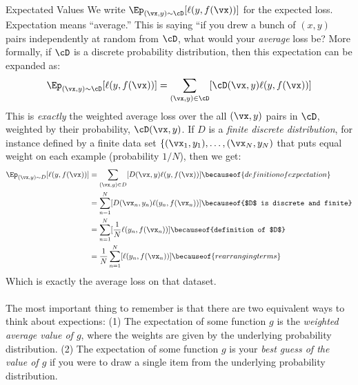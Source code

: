 \begin{mathreview}{Expectated Values}
We write $\Ep_{(\vx,y) \sim \cD} [ \ell(y, f(\vx)) ]$ for the expected loss. Expectation means ``average.'' This is saying ``if you drew a bunch of $(x,y)$ pairs independently at random from $\cD$, what would your \emph{average} loss be?%
More formally, if $\cD$ is a discrete probability distribution, then this expectation can be expanded as:
%
\begin{equation}
  \Ep_{(\vx,y) \sim \cD} [ \ell(y, f(\vx)) ] = \sum_{(\vx,y) \in \cD} [ \cD(\vx,y) \ell(y, f(\vx)) ]
\end{equation}
%
This is \emph{exactly} the weighted average loss over the all $(\vx,y)$ pairs in $\cD$, weighted by their probability, $\cD(\vx,y)$.
If $D$ is a \emph{finite discrete distribution}, for instance defined by a finite data set $\{ (\vx_1,y_1), \dots, (\vx_N,y_N)$ that puts equal weight on each example (probability $1/N$), then we get:
%
\begin{align}
\Ep_{(\vx,y) \sim D} [ \ell(y, f(\vx)) ]
&= \sum_{(\vx,y) \in D} [ D(\vx,y) \ell(y, f(\vx)) ]
   \becauseof{definition of expectation}\\
&= \sum_{n=1}^N [ D(\vx_n,y_n) \ell(y_n, f(\vx_n)) ]
   \becauseof{$D$ is discrete and finite}\\
&= \sum_{n=1}^N [ \frac 1 N \ell(y_n, f(\vx_n)) ]
   \becauseof{definition of $D$}\\
&= \frac 1 N  \sum_{n=1}^N [ \ell(y_n, f(\vx_n)) ]
   \becauseof{rearranging terms}
\end{align}
%
Which is exactly the average loss on that dataset.
\\~\\
The most important thing to remember is that there are two equivalent ways to think about expections:
(1) The expectation of some function $g$ is the \emph{weighted average value of $g$}, where the weights are given by the underlying probability distribution.
(2) The expectation of some function $g$ is your \emph{best guess of the value of $g$} if you were to draw a single item from the underlying probability distribution.
\end{mathreview}


